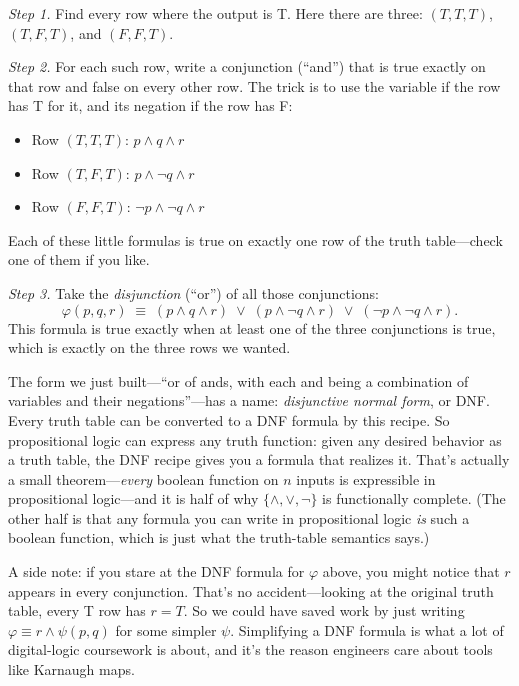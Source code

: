 \documentclass[11pt]{article}
\begin{document}
\emph{Step 1.} Find every row where the output is T. Here there are three: $(T,T,T)$, $(T,F,T)$, and $(F,F,T)$.

\emph{Step 2.} For each such row, write a conjunction (``and'') that is true exactly on that row and false on every other row. The trick is to use the variable if the row has T for it, and its negation if the row has F:
\begin{itemize}
  \item Row $(T, T, T)$: $p \wedge q \wedge r$
  \item Row $(T, F, T)$: $p \wedge \lnot q \wedge r$
  \item Row $(F, F, T)$: $\lnot p \wedge \lnot q \wedge r$
\end{itemize}
Each of these little formulas is true on exactly one row of the truth table---check one of them if you like.

\emph{Step 3.} Take the \emph{disjunction} (``or'') of all those conjunctions:
\[
  \varphi(p, q, r) \;\equiv\; (p \wedge q \wedge r) \;\vee\; (p \wedge \lnot q \wedge r) \;\vee\; (\lnot p \wedge \lnot q \wedge r).
\]
This formula is true exactly when at least one of the three conjunctions is true, which is exactly on the three rows we wanted.

The form we just built---``or of ands, with each and being a combination of variables and their negations''---has a name: \emph{disjunctive normal form}, or DNF. Every truth table can be converted to a DNF formula by this recipe. So propositional logic can express any truth function: given any desired behavior as a truth table, the DNF recipe gives you a formula that realizes it. That's actually a small theorem---\emph{every} boolean function on $n$ inputs is expressible in propositional logic---and it is half of why $\{\wedge, \vee, \lnot\}$ is functionally complete. (The other half is that any formula you can write in propositional logic \emph{is} such a boolean function, which is just what the truth-table semantics says.)

A side note: if you stare at the DNF formula for $\varphi$ above, you might notice that $r$ appears in every conjunction. That's no accident---looking at the original truth table, every T row has $r = T$. So we could have saved work by just writing $\varphi \equiv r \wedge \psi(p, q)$ for some simpler $\psi$. Simplifying a DNF formula is what a lot of digital-logic coursework is about, and it's the reason engineers care about tools like Karnaugh maps.
\end{document}
